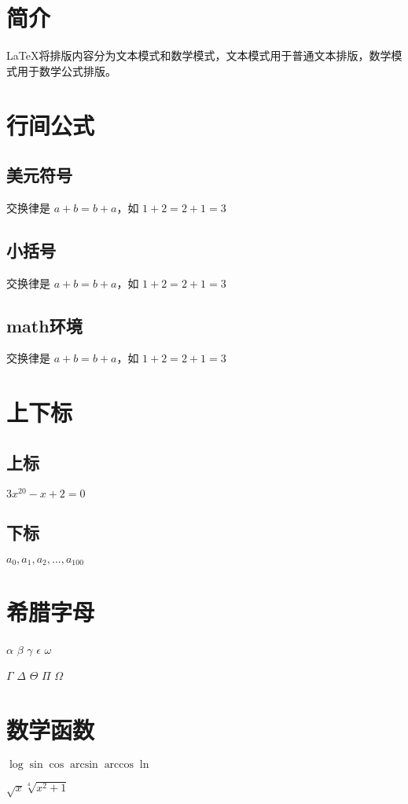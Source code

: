 \documentclass{article}		%
\begin{document}
	\section{简介}	%
		\LaTeX{}将排版内容分为文本模式和数学模式，文本模式用于普通文本排版，数学模式用于数学公式排版。
	\section{行间公式}
		\subsection{美元符号}	%
			交换律是 $a+b=b+a$，如 $1+2=2+1=3$
		\subsection{小括号}
			交换律是 \(a+b=b+a\)，如 \(1+2=2+1=3\)
		\subsection{math环境}
			交换律是 \begin{math}a+b=b+a\end{math}，如 \begin{math}1+2=2+1=3\end{math}
		\section{上下标}
			\subsection{上标}
				$3x^{20} - x + 2 = 0$
			\subsection{下标}
				$a_0, a_1, a_2, ... , a_{100}$
		\section{希腊字母}
			$\alpha$
			$\beta$
			$\gamma$
			$\epsilon$
			$\omega$

			$\Gamma$
			$\Delta$
			$\Theta$
			$\Pi$
			$\Omega$
		\section{数学函数}
			$\log \sin \cos \arcsin \arccos \ln$
			
			$\sqrt{x} \sqrt[4]{x^2 + 1}$
\end{document}
